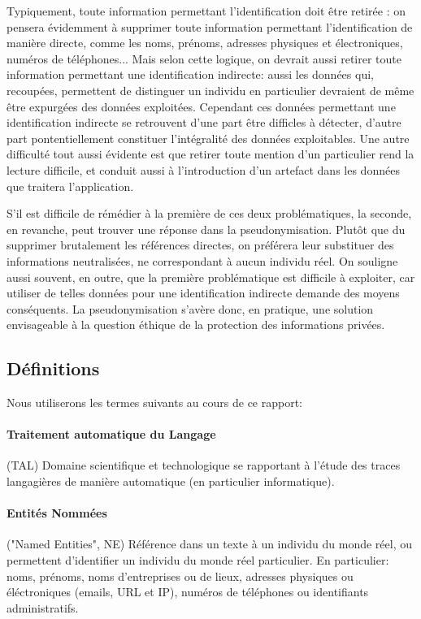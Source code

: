 \documentclass{article}
\begin{document}
Typiquement, toute information permettant l'identification doit être retirée : on pensera évidemment à supprimer toute information permettant l'identification de manière directe, comme les noms, prénoms, adresses physiques et électroniques, numéros de téléphones...
Mais selon cette logique, on devrait aussi retirer toute information permettant une identification indirecte: aussi les données qui, recoupées, permettent de distinguer un individu en particulier devraient de même être expurgées des données exploitées.
Cependant ces données permettant une identification indirecte se retrouvent d'une part être difficles à détecter, d'autre part pontentiellement constituer l'intégralité des données exploitables.
Une autre difficulté tout aussi évidente est que retirer toute mention d'un particulier rend la lecture difficile, et conduit aussi à l'introduction d'un artefact dans les données que traitera l'application.
\par
S'il est difficile de rémédier à la première de ces deux problématiques, la seconde, en revanche, peut trouver une réponse dans la pseudonymisation.
Plutôt que du supprimer brutalement les références directes, on préférera leur substituer des informations neutralisées, ne correspondant à aucun individu réel.
On souligne aussi souvent, en outre, que la première problématique est difficile à exploiter, car utiliser de telles données pour une identification indirecte demande des moyens conséquents.
La pseudonymisation s'avère donc, en pratique, une solution envisageable à la question éthique de la protection des informations privées.

\subsection{Définitions}
Nous utiliserons les termes suivants au cours de ce rapport:
\paragraph{Traitement automatique du Langage} (TAL) Domaine scientifique et technologique se rapportant à l'étude des traces langagières de manière automatique (en particulier informatique).
\paragraph{Entités Nommées} ("Named Entities", NE) Référence dans un texte à un individu du monde réel, ou permettent d'identifier un individu du monde réel particulier.
En particulier: noms, prénoms, noms d'entreprises ou de lieux, adresses physiques ou éléctroniques (emails, URL et IP), numéros de téléphones ou identifiants administratifs.
\end{document}
